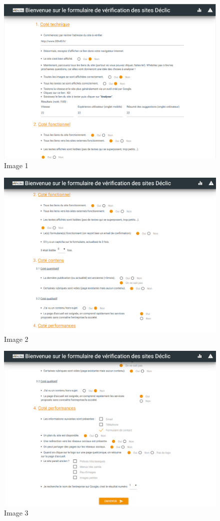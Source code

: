 \documentclass[report]{tnreport}
\begin{document}
\begin{figure}[h]
  \centering
  \includegraphics[width=18cm]{figures/form1}
  \caption{Image 1}
  \label{fig:form1}
\end{figure}
\begin{figure}[h]
  \centering
  \includegraphics[width=18cm]{figures/form2}
  \caption{Image 2}
  \label{fig:form2}
\end{figure}
\begin{figure}[h]
  \centering
  \includegraphics[width=18cm]{figures/form3}
  \caption{Image 3}
  \label{fig:form3}
\end{figure}
\end{document}
